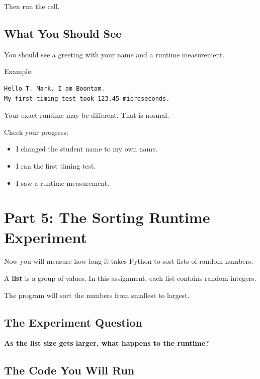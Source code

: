 \documentclass[11pt]{article}
\newcommand{\checkbox}{$\square$}
\begin{document}
Then run the cell.

\subsection*{What You Should See}

You should see a greeting with your name and a runtime measurement.

Example:

\begin{lstlisting}[style=pythonstyle]
Hello T. Mark. I am Boontam.
My first timing test took 123.45 microseconds.
\end{lstlisting}

\noindent Your exact runtime may be different. That is normal.

\noindent Check your progress:

\begin{itemize}
    \item[\checkbox] I changed the student name to my own name.
    \item[\checkbox] I ran the first timing test.
    \item[\checkbox] I saw a runtime measurement.
\end{itemize}

\section*{Part 5: The Sorting Runtime Experiment}

Now you will measure how long it takes Python to sort lists of random numbers.

A \textbf{list} is a group of values. In this assignment, each list contains random integers.

The program will sort the numbers from smallest to largest.

\subsection*{The Experiment Question}

\begin{center}
\textbf{As the list size gets larger, what happens to the runtime?}
\end{center}

\subsection*{The Code You Will Run}
\end{document}
